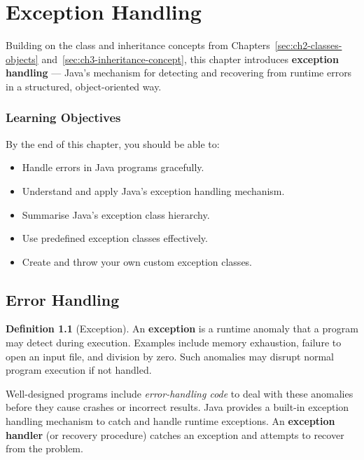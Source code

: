 \documentclass[11pt, a4paper, notitlepage]{report}
\theoremstyle{definition}
\newtheorem{definition}[theorem]{Definition}
\theoremstyle{remark}
\theoremstyle{definition}
\begin{document}
%

\chapter{Exception Handling}
\label{chap:exception-handling}

Building on the class and inheritance concepts from Chapters~\ref{sec:ch2-classes-objects} and~\ref{sec:ch3-inheritance-concept}, this chapter introduces \textbf{exception handling} --- Java's mechanism for detecting and recovering from runtime errors in a structured, object-oriented way.

\subsection{Learning Objectives}
\label{sec:ch4-objectives}

By the end of this chapter, you should be able to:
\begin{itemize}
  \item Handle errors in Java programs gracefully.
  \item Understand and apply Java's exception handling mechanism.
  \item Summarise Java's exception class hierarchy.
  \item Use predefined exception classes effectively.
  \item Create and throw your own custom exception classes.
\end{itemize}

\section{Error Handling}
\label{sec:ch4-error-handling}

\begin{definition}[Exception]
\label{def:ch4-exception}
An \textbf{exception} is a runtime anomaly that a program may detect during execution. Examples include memory exhaustion, failure to open an input file, and division by zero. Such anomalies may disrupt normal program execution if not handled.
\end{definition}

Well-designed programs include \emph{error-handling code} to deal with these anomalies before they cause crashes or incorrect results. Java provides a built-in exception handling mechanism to catch and handle runtime exceptions. An \textbf{exception handler} (or recovery procedure) catches an exception and attempts to recover from the problem.
\end{document}
